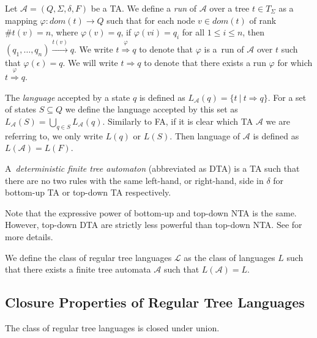 Let $\mathcal{A} = (Q, \Sigma, \delta, F)$ be a TA. We define a \emph{run} of
$\mathcal{A}$ over a tree $t \in T_\Sigma$ as a mapping $\varphi: dom(t) \to Q$
such that for each node $v \in dom(t)$ of rank $\#t(v) = n$, where $\varphi(v) =
q$, if $\varphi(vi) = q_i$ for all $1 \leq i \leq n$, then $(q_1,\ldots,q_n)
\overset{t(v)}{\longrightarrow} q$. We write $t
\overset{\varphi}{\Longrightarrow} q$ to denote that $\varphi$ is a~run of
$\mathcal{A}$ over $t$ such that $\varphi(\epsilon) = q$. We will write $t
\Longrightarrow q$ to denote that there exists a run $\varphi$ for which $t
\overset{\varphi}{\Longrightarrow} q$.

The \emph{language} accepted by a state $q$ is defined as $L_{\mathcal{A}}(q) =
\{t\ |\ t \Rightarrow q\}$. For a set of states $S \subseteq Q$ we define the
language accepted by this set as $L_{\mathcal{A}}(S) = \bigcup_{q \in S}
L_{\mathcal{A}}(q)$. Similarly to FA, if it is clear which TA $\mathcal{A}$ we
are referring to, we only write $L(q)$ or $L(S)$. Then language of $\mathcal{A}$
is defined as $L(\mathcal{A}) = L(F)$.

\begin{defz}
A~\emph{deterministic finite tree automaton} (abbreviated as DTA) is a
TA such that there are no two rules with the
same left-hand, or right-hand, side in $\delta$ for bottom-up TA or top-down
TA respectively.
\end{defz}

Note that the expressive power of bottom-up and top-down NTA is the same.
However, top-down DTA are strictly less powerful than top-down NTA. See
\cite{tata} for more details.

\begin{defz}
We define the class of regular tree languages $\mathcal{L}$ as the class of
languages $L$ such that there exists a finite tree automata $\mathcal{A}$ such that
$L(\mathcal{A}) = L$.
\end{defz}



\subsection{Closure Properties of Regular Tree Languages}\label{ta-closures}

\begin{theorem}
 The class of regular tree languages is closed under union.
\end{theorem}

